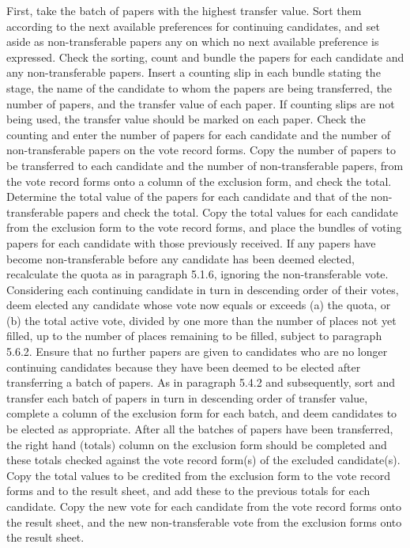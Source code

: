 First, take the batch of papers with the highest transfer value. Sort them according to the next available preferences for continuing candidates, and set aside as non-transferable papers any on which no next available preference is expressed.
Check the sorting, count and bundle the papers for each candidate and any non-transferable papers. Insert a counting slip in each bundle stating the stage, the name of the candidate to whom the papers are being transferred, the number of papers, and the transfer value of each paper. If counting slips are not being used, the transfer value should be marked on each paper.
Check the counting and enter the number of papers for each candidate and the number of non-transferable papers on the vote record forms.
Copy the number of papers to be transferred to each candidate and the number of non-transferable papers, from the vote record forms onto a column of the exclusion form, and check the total.
Determine the total value of the papers for each candidate and that of the non-transferable papers and check the total.
Copy the total values for each candidate from the exclusion form to the vote record forms, and place the bundles of voting papers for each candidate with those previously received.
If any papers have become non-transferable before any candidate has been deemed elected, recalculate the quota as in paragraph 5.1.6, ignoring the non-transferable vote.
Considering each continuing candidate in turn in descending order of their votes, deem elected any candidate whose vote now equals or exceeds
    (a)    the quota, or
    (b)    the total active vote, divided by one more than the number of places not yet filled,
    up to the number of places remaining to be filled, subject to paragraph 5.6.2.
Ensure that no further papers are given to candidates who are no longer continuing candidates because they have been deemed to be elected after transferring a batch of papers.
As in paragraph 5.4.2 and subsequently, sort and transfer each batch of papers in turn in descending order of transfer value, complete a column of the exclusion form for each batch, and deem candidates to be elected as appropriate.
After all the batches of papers have been transferred, the right hand (totals) column on the exclusion form should be completed and these totals checked against the vote record form(s) of the excluded candidate(s).
Copy the total values to be credited from the exclusion form to the vote record forms and to the result sheet, and add these to the previous totals for each candidate.
Copy the new vote for each candidate from the vote record forms onto the result sheet, and the new non-transferable vote from the exclusion forms onto the result sheet.
